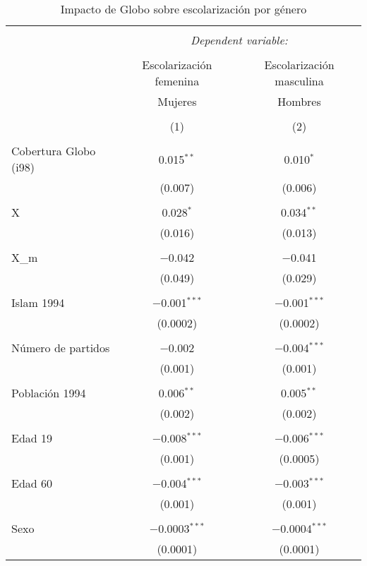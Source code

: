 
\begin{table}[!htbp] \centering 
  \caption{Impacto de Globo sobre escolarización por género} 
  \label{tab:globo_genero} 
\begin{tabular}{@{\extracolsep{5pt}}lcc} 
\\[-1.8ex]\hline 
\hline \\[-1.8ex] 
 & \multicolumn{2}{c}{\textit{Dependent variable:}} \\ 
\cline{2-3} 
\\[-1.8ex] & Escolarización femenina & Escolarización masculina \\ 
 & Mujeres & Hombres \\ 
\\[-1.8ex] & (1) & (2)\\ 
\hline \\[-1.8ex] 
 Cobertura Globo (i98) & 0.015$^{**}$ & 0.010$^{*}$ \\ 
  & (0.007) & (0.006) \\ 
  & & \\ 
 X & 0.028$^{*}$ & 0.034$^{**}$ \\ 
  & (0.016) & (0.013) \\ 
  & & \\ 
 X_m & $-$0.042 & $-$0.041 \\ 
  & (0.049) & (0.029) \\ 
  & & \\ 
 Islam 1994 & $-$0.001$^{***}$ & $-$0.001$^{***}$ \\ 
  & (0.0002) & (0.0002) \\ 
  & & \\ 
 Número de partidos & $-$0.002 & $-$0.004$^{***}$ \\ 
  & (0.001) & (0.001) \\ 
  & & \\ 
 Población 1994 & 0.006$^{**}$ & 0.005$^{**}$ \\ 
  & (0.002) & (0.002) \\ 
  & & \\ 
 Edad 19 & $-$0.008$^{***}$ & $-$0.006$^{***}$ \\ 
  & (0.001) & (0.0005) \\ 
  & & \\ 
 Edad 60 & $-$0.004$^{***}$ & $-$0.003$^{***}$ \\ 
  & (0.001) & (0.001) \\ 
  & & \\ 
 Sexo & $-$0.0003$^{***}$ & $-$0.0004$^{***}$ \\ 
  & (0.0001) & (0.0001) \\ 

\end{tabular}
\end{table}
